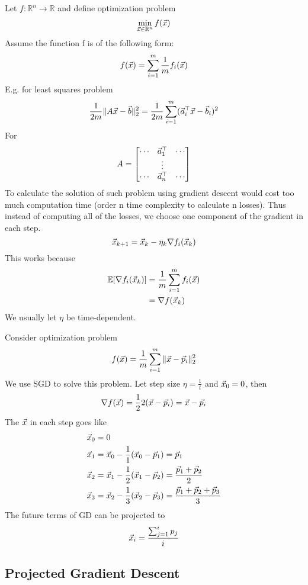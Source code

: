 \begin{definition}
	Let $f:\mathbb{R}^n\rightarrow\mathbb{R}$ and define optimization problem
	\[
\min_{\vec{x}\in\mathbb{R}^n}f(\vec{x})
	\]
Assume the function f is of the following form:
\[
f(\vec{x}) = \sum_{i=1}^m \frac{1}{m}f_i(\vec{x})
\]
E.g. for least squares problem
\[
\frac{1}{2m}\|A\vec{x}-\vec{b}\|_2^2 = \frac{1}{2m}\sum_{i=1}^m(\vec{a}_i^\top\vec{x}-\vec{b}_i)^2
\]
For
\[
A = \begin{bmatrix}
	\cdots & \vec{a}_1^\top & \cdots \\
	&\vdots&\\
	\cdots & \vec{a}_n^\top & \cdots \\
\end{bmatrix}
\]
To calculate the solution of such problem using gradient descent would cost too much computation time (order n time complexity to calculate n losses). Thus instead of computing all of the losses, we choose one component of the gradient in each step.
\[
\vec{x}_{k+1} = \vec{x}_k-\eta_k\nabla f_i(\vec{x}_k)
\]
This works because
\begin{align*}
	\mathbb{E}[\nabla f_i(\vec{x}_k)] &= \frac{1}{m}\sum_{i=1}^mf_i(\vec{x}) \\
	&= \nabla f(\vec{x}_k)
\end{align*}
We usually let $\eta$ be time-dependent.
\end{definition}

\begin{example}
	Consider optimization problem
	\[
f(\vec{x}) = \frac{1}{m}\sum_{i=1}^m\|\vec{x}-\vec{p}_i\|_2^2
	\]
	We use SGD to solve this problem. Let step size $\eta = \frac{1}{t}$ and $\vec{x}_0 = 0$, then
	\[
\nabla f(\vec{x}) = \frac{1}{2}2(\vec{x}-\vec{p}_i) = \vec{x}-\vec{p}_i
	\]
	The $\vec{x}$ in each step goes like
	\begin{align*}
		\vec{x}_0 &= 0\\
		\vec{x}_1 &= \vec{x}_0 - \frac{1}{1}(\vec{x}_0-\vec{p}_1) = \vec{p}_1\\
		\vec{x}_2 &= \vec{x}_1 - \frac{1}{2}(\vec{x}_1-\vec{p}_2) = \frac{\vec{p}_1+\vec{p}_2}{2}\\
		\vec{x}_3 &= \vec{x}_2 - \frac{1}{3}(\vec{x}_2-\vec{p}_3) = \frac{\vec{p}_1+\vec{p}_2+\vec{p}_3}{3}
	\end{align*}
	The future terms of GD can be projected to
	\[
\vec{x}_i = \frac{\sum_{j=1}^ip_j}{i}
	\]
\end{example}


\subsection{Projected Gradient Descent} %
\label{sub:projected_gradient_descent}


